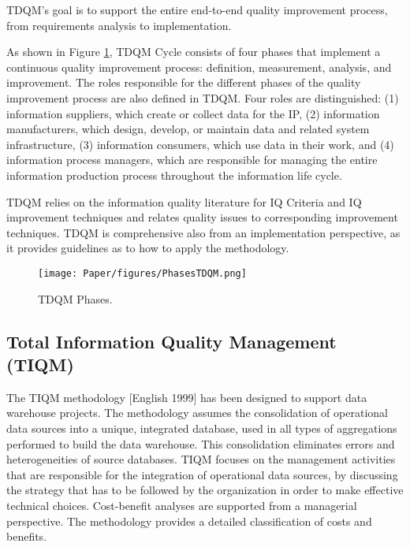 \documentclass[pdftex,english,oribibl]{llncs}
\begin{document}
TDQM's goal is to support the entire end-to-end quality improvement process, from requirements analysis to implementation.

As shown in Figure \ref{fig:PhasesTDQM}, TDQM Cycle consists of four phases that implement a continuous quality improvement process: definition, measurement, analysis, and improvement.
The roles responsible for the different phases of the quality improvement process are also defined in TDQM.
Four roles are distinguished: (1) information suppliers, which create or collect data for the IP, (2) information manufacturers, which design, develop, or maintain data and related system infrastructure, (3) information consumers, which use data in their work, and  (4) information process managers, which are responsible for managing the entire information production process throughout the information life cycle.

TDQM relies on the information quality literature for IQ Criteria and IQ improvement techniques and relates quality issues to corresponding improvement techniques.
TDQM is comprehensive also from an implementation perspective, as it provides guidelines as to how to apply the methodology.

\begin{comment}
In applying TDQM, an organization must:
(a) clearly understand the IPs;
(b) establish an IP team consisting of a senior executive as the TDQM champion, an IP engineer who is familiar with the TDQM methodology, and members who are information suppliers, manufacturers, consumers, and IP managers;
(c) teach IQ assessment and IQ management to all the IP constituencies; and
(d) institutionalize continuous IP improvement.
\end{comment}



\begin{figure}
    \centering
    \texttt{[image: Paper/figures/PhasesTDQM.png]}
    \caption{TDQM Phases.}
    \label{fig:PhasesTDQM}
 \end{figure}

\subsection{Total Information Quality Management (TIQM)}

The TIQM methodology [English 1999] has been designed to support data warehouse projects. The methodology assumes the consolidation of operational data sources into a unique, integrated database, used in all types of aggregations performed to build the data warehouse. This consolidation eliminates errors and heterogeneities of source databases. TIQM focuses on the management activities that are responsible for the integration of operational data sources, by discussing the strategy that has to be followed by the organization in order to make effective technical choices. Cost-benefit analyses are supported from a managerial perspective. The methodology provides a detailed classification of costs and benefits.
\end{document}
